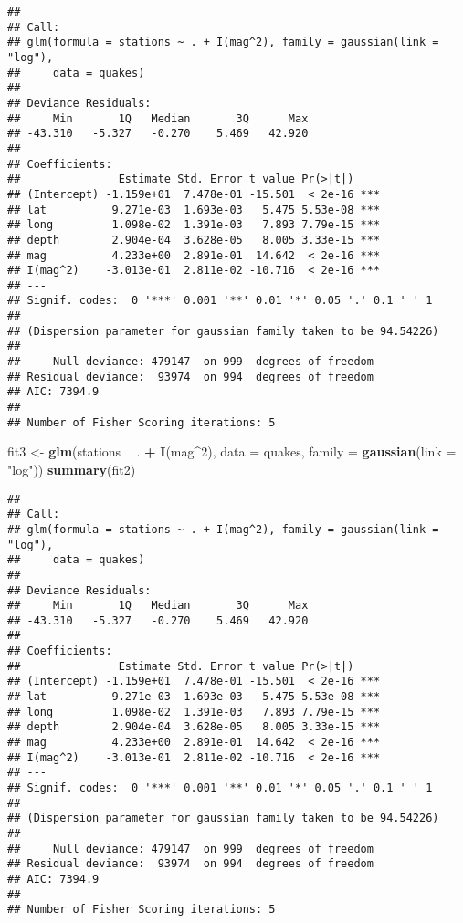 \documentclass[
]{article}
\newenvironment{Shaded}{\begin{snugshade}}{\end{snugshade}}
\newcommand{\DataTypeTok}[1]{\textcolor[rgb]{0.13,0.29,0.53}{#1}}
\newcommand{\DecValTok}[1]{\textcolor[rgb]{0.00,0.00,0.81}{#1}}
\newcommand{\KeywordTok}[1]{\textcolor[rgb]{0.13,0.29,0.53}{\textbf{#1}}}
\newcommand{\NormalTok}[1]{#1}
\newcommand{\OperatorTok}[1]{\textcolor[rgb]{0.81,0.36,0.00}{\textbf{#1}}}
\newcommand{\StringTok}[1]{\textcolor[rgb]{0.31,0.60,0.02}{#1}}
\begin{document}
\begin{verbatim}
## 
## Call:
## glm(formula = stations ~ . + I(mag^2), family = gaussian(link = "log"), 
##     data = quakes)
## 
## Deviance Residuals: 
##     Min       1Q   Median       3Q      Max  
## -43.310   -5.327   -0.270    5.469   42.920  
## 
## Coefficients:
##               Estimate Std. Error t value Pr(>|t|)    
## (Intercept) -1.159e+01  7.478e-01 -15.501  < 2e-16 ***
## lat          9.271e-03  1.693e-03   5.475 5.53e-08 ***
## long         1.098e-02  1.391e-03   7.893 7.79e-15 ***
## depth        2.904e-04  3.628e-05   8.005 3.33e-15 ***
## mag          4.233e+00  2.891e-01  14.642  < 2e-16 ***
## I(mag^2)    -3.013e-01  2.811e-02 -10.716  < 2e-16 ***
## ---
## Signif. codes:  0 '***' 0.001 '**' 0.01 '*' 0.05 '.' 0.1 ' ' 1
## 
## (Dispersion parameter for gaussian family taken to be 94.54226)
## 
##     Null deviance: 479147  on 999  degrees of freedom
## Residual deviance:  93974  on 994  degrees of freedom
## AIC: 7394.9
## 
## Number of Fisher Scoring iterations: 5
\end{verbatim}

\begin{Shaded}
\begin{Highlighting}[]
\NormalTok{fit3 <-}\StringTok{ }\KeywordTok{glm}\NormalTok{(stations }\OperatorTok{~}\StringTok{ }\NormalTok{. }\OperatorTok{+}\StringTok{ }\KeywordTok{I}\NormalTok{(mag}\OperatorTok{^}\DecValTok{2}\NormalTok{), }\DataTypeTok{data =}\NormalTok{ quakes, }\DataTypeTok{family =} \KeywordTok{gaussian}\NormalTok{(}\DataTypeTok{link =} \StringTok{"log"}\NormalTok{))}
\KeywordTok{summary}\NormalTok{(fit2)}
\end{Highlighting}
\end{Shaded}

\begin{verbatim}
## 
## Call:
## glm(formula = stations ~ . + I(mag^2), family = gaussian(link = "log"), 
##     data = quakes)
## 
## Deviance Residuals: 
##     Min       1Q   Median       3Q      Max  
## -43.310   -5.327   -0.270    5.469   42.920  
## 
## Coefficients:
##               Estimate Std. Error t value Pr(>|t|)    
## (Intercept) -1.159e+01  7.478e-01 -15.501  < 2e-16 ***
## lat          9.271e-03  1.693e-03   5.475 5.53e-08 ***
## long         1.098e-02  1.391e-03   7.893 7.79e-15 ***
## depth        2.904e-04  3.628e-05   8.005 3.33e-15 ***
## mag          4.233e+00  2.891e-01  14.642  < 2e-16 ***
## I(mag^2)    -3.013e-01  2.811e-02 -10.716  < 2e-16 ***
## ---
## Signif. codes:  0 '***' 0.001 '**' 0.01 '*' 0.05 '.' 0.1 ' ' 1
## 
## (Dispersion parameter for gaussian family taken to be 94.54226)
## 
##     Null deviance: 479147  on 999  degrees of freedom
## Residual deviance:  93974  on 994  degrees of freedom
## AIC: 7394.9
## 
## Number of Fisher Scoring iterations: 5
\end{verbatim}
\end{document}
